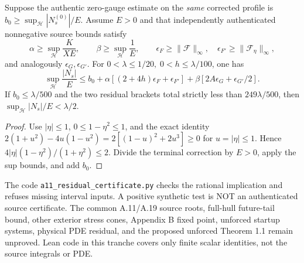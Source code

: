\begin{proposition}
Suppose the authentic zero-gauge estimate on the \emph{same}
corrected profile is \(b_0\ge\sup_{\mathcal H}|N_s^{(0)}|/E\).
Assume \(E>0\) and that independently authenticated nonnegative
source bounds satisfy
\[
 \alpha\ge\sup_{\mathcal H}\frac{K}{XE},\qquad
 \beta\ge\sup_{\mathcal H}\frac1E,\qquad
 \epsilon_F\ge\|\mathcal F\|_\infty,\quad
 \epsilon_{F'}\ge\|\mathcal F_\eta\|_\infty,
\]
and analogously \(\epsilon_G,\epsilon_{G'}\).
For \(0<\lambda\le1/20,\;0<h\le\lambda/100\), one has
\[
 \sup_{\mathcal H}\frac{|N_s|}{E}\le b_0+
 \alpha[(2+4h)\epsilon_F+\epsilon_{F'}]
 +\beta[2A\epsilon_G+\epsilon_{G'}/2].
\]
If \(b_0\le\lambda/500\) and the two residual brackets total
strictly less than \(249\lambda/500\), then
\(\sup_{\mathcal H}|N_s|/E<\lambda/2\).
\end{proposition}
\begin{proof}
Use \(|\eta|\le1\), \(0\le1-\eta^2\le1\), and the exact identity
\(2(1+u^2)-4u(1-u^2)=2[(1-u)^2+2u^3]\ge0\)
for \(u=|\eta|\le1\). Hence
\(4|\eta|(1-\eta^2)/(1+\eta^2)\le2\).
Divide the terminal correction by \(E>0\), apply the sup bounds,
and add \(b_0\).
\end{proof}
The code \texttt{a11\_residual\_certificate.py} checks the
rational implication and refuses missing interval inputs.
A positive synthetic test is NOT an authenticated source certificate.
The common A.11/A.19 source roots, full-hull future-tail bound,
other exterior stress cones, Appendix B fixed point, unforced startup
systems, physical PDE residual, and the proposed unforced
Theorem 1.1 remain unproved. Lean code in this tranche covers
only finite scalar identities, not the source integrals or PDE.
